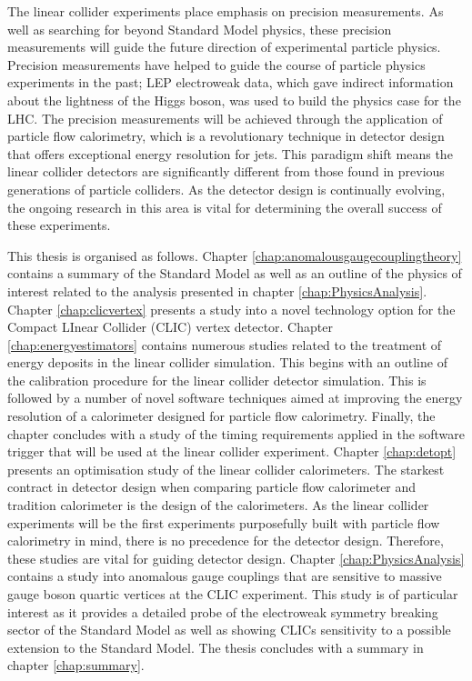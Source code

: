 The linear collider experiments place emphasis on precision measurements.  As well as searching for beyond Standard Model physics, these precision measurements will guide the future direction of experimental particle physics.  Precision measurements have helped to guide the course of particle physics experiments in the past; LEP electroweak data, which gave indirect information about the lightness of the Higgs boson, was used to build the physics case for the LHC.  The precision measurements will be achieved through the application of particle flow calorimetry, which is a revolutionary technique in detector design that offers exceptional energy resolution for jets.  This paradigm shift means the linear collider detectors are significantly different from those found in previous generations of particle colliders.  As the detector design is continually evolving, the ongoing research in this area is vital for determining the overall success of these experiments.  

This thesis is organised as follows.  Chapter \ref{chap:anomalousgaugecouplingtheory} contains a summary of the Standard Model as well as an outline of the physics of interest related to the analysis presented in chapter \ref{chap:PhysicsAnalysis}.  Chapter \ref{chap:clicvertex} presents a study into a novel technology option for the Compact LInear Collider (CLIC) vertex detector.  Chapter \ref{chap:energyestimators} contains numerous studies related to the treatment of energy deposits in the linear collider simulation.  This begins with an outline of the calibration procedure for the linear collider detector simulation.  This is followed by a number of novel software techniques aimed at improving the energy resolution of a calorimeter designed for particle flow calorimetry.  Finally, the chapter concludes with a study of the timing requirements applied in the software trigger that will be used at the linear collider experiment.  Chapter \ref{chap:detopt} presents an optimisation study of the linear collider calorimeters.  The starkest contract in detector design when comparing particle flow calorimeter and tradition calorimeter is the design of the calorimeters.  As the linear collider experiments will be the first experiments purposefully built with particle flow calorimetry in mind, there is no precedence for the detector design.  Therefore, these studies are vital for guiding detector design.  Chapter \ref{chap:PhysicsAnalysis} contains a study into anomalous gauge couplings that are sensitive to massive gauge boson quartic vertices at the CLIC experiment.  This study is of particular interest as it provides a detailed probe of the electroweak symmetry breaking sector of the Standard Model as well as showing CLICs sensitivity to a possible extension to the Standard Model.  The thesis concludes with a summary in chapter \ref{chap:summary}.


